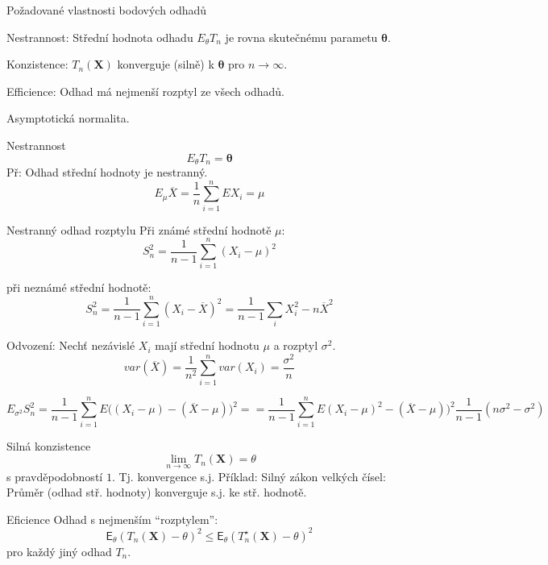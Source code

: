 \documentclass[smaller]{beamer}
\def\to{\rightarrow}
\def\vc#1{\mathbf{\boldsymbol{#1}}}     %
\def\xskip{{\vspace{2ex}}}
\def\E{\vc{\mathsf{E}}}
\begin{document}
\begin{frame}{Požadované vlastnosti bodových odhadů}
 \begin{description}
  \item Nestrannost: Střední hodnota odhadu $E_\theta T_n$ je rovna skutečnému parametu $\vc \theta$.
  \item Konzistence: $T_n(\vc X)$ konverguje (silně) k $\vc \theta$ pro $n\to \infty$.
  \item Efficience: Odhad má nejmenší rozptyl ze všech odhadů.
  \item Asymptotická normalita.
 \end{description}

\end{frame}


\begin{frame}{Nestrannost}
\[
   E_\theta T_n = \vc \theta
\]
Př: Odhad střední hodnoty je nestranný.
\[ 
   E_\mu \overline{X} = \frac{1}{n} \sum_{i=1}^n E X_i = \mu
\]
\end{frame}

\begin{frame}{Nestranný odhad rozptylu}
Při známé střední hodnotě $\mu$:
\[
   S_n^2 = \frac{1}{n-1} \sum_{i=1}^n (X_i - \mu)^2
\]

při neznámé střední hodnotě:
\[
  S_n^2 = \frac{1}{n-1} \sum_{i=1}^n (X_i - \overline{X})^2 = \frac{1}{n-1} \sum_i X_i^2 - n\overline{X}^2
\]

\end{frame}

\begin{frame}{Odvození:}
 Nechť nezávislé $X_i$ mají střední hodnotu $\mu$ a rozptyl $\sigma^2$.
\[
   var(\overline{X}) = \frac{1}{n^2}\sum_{i=1}^n var(X_i) = \frac{\sigma^2}{n}
\]

\[
   E_{\sigma^2} S_n^2 = \frac{1}{n-1} \sum_{i=1}^n E\big((X_i-\mu) - (\overline{X} -\mu)\big)^2=
   =\frac{1}{n-1} \sum_{i=1}^n E(X_i-\mu)^2 - (\overline{X} -\mu)\big)^2
\frac{1}{n-1}(n\sigma^2 - \sigma^2)
\]
\end{frame}

\begin{frame}{Silná konzistence}
\[
   \lim_{n\to \infty} T_n(\vc X) = \theta
\]
s pravděpodobností $1$. Tj. konvergence s.j.
\xskip
Příklad:
Silný zákon velkých čísel: Průměr (odhad stř. hodnoty) konverguje s.j. ke stř. hodnotě.
\end{frame}

\begin{frame}{Eficience}
Odhad s nejmenším ``rozptylem'':
\[
\E_\theta(T_n(\vc X) - \theta)^2 \le \E_\theta(T_n^{\star}(\vc X) - \theta)^2
\]
pro každý jiný odhad $T_n$.

\end{frame}
\end{document}

